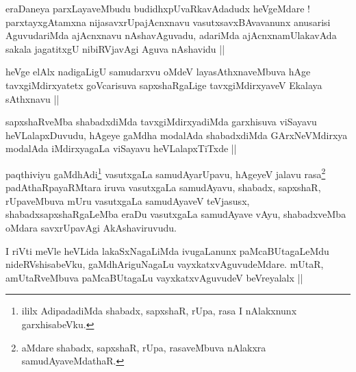 
\begin{artha}
eraDaneya parxLayaveMbudu budidhxpUvaRkavAdadudx heVgeMdare ! parxtayxgAtamxna nijasavxrUpajAcnxnavu vasutxsavxBAvavanunx anusarisi AguvudariMda ajAcnxnavu nAshavAguvadu, adariMda ajAcnxnamUlakavAda sakala jagatitxgU nibiRVjavAgi Aguva nAshavidu ||
\end{artha}


\begin{artha}
heVge elAlx nadigaLigU samudarxvu oMdeV layasAthxnaveMbuva hAge tavxgiMdirxyatetx goVcarisuva sapxshaRgaLige tavxgiMdirxyaveV Ekalaya sAthxnavu ||
\end{artha}

\begin{artha}
sapxshaRveMba shabadxdiMda tavxgiMdirxyadiMda garxhisuva viSayavu heVLalapxDuvudu, hAgeye gaMdha modalAda shabadxdiMda GArxNeVMdirxya modalAda iMdirxyagaLa viSayavu heVLalapxTiTxde ||
\end{artha}


\begin{artha}
paqthiviyu gaMdhAdi\footnote[1]{ililx AdipadadiMda shabadx, sapxshaR, rUpa, rasa I nAlakxnunx garxhisabeVku.} vasutxgaLa samudAyarUpavu, hAgeyeV jalavu rasa\footnote[2]{aMdare shabadx, sapxshaR, rUpa, rasaveMbuva nAlakxra samudAyaveMdathaR.} padAthaRpayaRMtara iruva vasutxgaLa samudAyavu, shabadx, sapxshaR, rUpaveMbuva mUru vasutxgaLa samudAyaveV teVjasusx, shabadxsapxshaRgaLeMba eraDu vasutxgaLa samudAyave vAyu, shabadxveMba oMdara savxrUpavAgi AkAshaviruvudu.
\end{artha}

\begin{artha}
I riVti meVle heVLida lakaSxNagaLiMda ivugaLanunx paMcaBUtagaLeMdu nideRVshisabeVku, gaMdhAriguNagaLu vayxkatxvAguvudeMdare. mUtaR, amUtaRveMbuva paMcaBUtagaLu vayxkatxvAguvudeV beVreyalalx ||
\end{artha}

